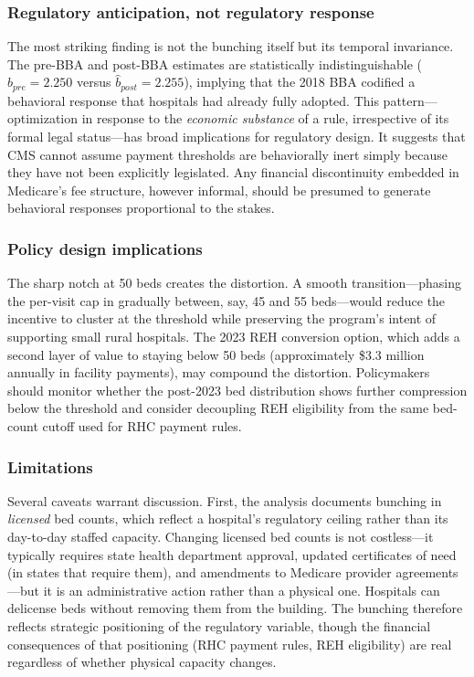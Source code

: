 \documentclass[12pt]{article}
\begin{document}
\subsubsection*{Regulatory anticipation, not regulatory response} The most striking finding is not the bunching itself but its temporal invariance. The pre-BBA and post-BBA estimates are statistically indistinguishable ($\hat{b}_{pre} = 2.250$ versus $\hat{b}_{post} = 2.255$), implying that the 2018 BBA codified a behavioral response that hospitals had already fully adopted. This pattern---optimization in response to the \textit{economic substance} of a rule, irrespective of its formal legal status---has broad implications for regulatory design. It suggests that CMS cannot assume payment thresholds are behaviorally inert simply because they have not been explicitly legislated. Any financial discontinuity embedded in Medicare's fee structure, however informal, should be presumed to generate behavioral responses proportional to the stakes.

\subsubsection*{Policy design implications} The sharp notch at 50 beds creates the distortion. A smooth transition---phasing the per-visit cap in gradually between, say, 45 and 55 beds---would reduce the incentive to cluster at the threshold while preserving the program's intent of supporting small rural hospitals. The 2023 REH conversion option, which adds a second layer of value to staying below 50 beds (approximately \$3.3 million annually in facility payments), may compound the distortion. Policymakers should monitor whether the post-2023 bed distribution shows further compression below the threshold and consider decoupling REH eligibility from the same bed-count cutoff used for RHC payment rules.

\subsubsection*{Limitations} Several caveats warrant discussion. First, the analysis documents bunching in \textit{licensed} bed counts, which reflect a hospital's regulatory ceiling rather than its day-to-day staffed capacity. Changing licensed bed counts is not costless---it typically requires state health department approval, updated certificates of need (in states that require them), and amendments to Medicare provider agreements---but it is an administrative action rather than a physical one. Hospitals can delicense beds without removing them from the building. The bunching therefore reflects strategic positioning of the regulatory variable, though the financial consequences of that positioning (RHC payment rules, REH eligibility) are real regardless of whether physical capacity changes.
\end{document}
